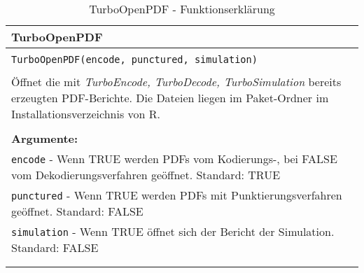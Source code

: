 \begin{longtable}{|p{\textwidth}|}
\hline
\rowcolor{lightblue}TurboOpenPDF\\
\hline
\\
\texttt{TurboOpenPDF(encode, punctured, simulation)}\\
\\
Öffnet die mit \emph{TurboEncode, TurboDecode, TurboSimulation} bereits erzeugten PDF-Berichte. Die Dateien liegen im Paket-Ordner im Installationsverzeichnis von R.\\
\\
\textbf{Argumente:}\\
\texttt{encode} - Wenn TRUE werden PDFs vom Kodierungs-, bei FALSE vom Dekodierungsverfahren geöffnet. Standard: TRUE\\
\texttt{punctured} - Wenn TRUE werden PDFs mit Punktierungsverfahren geöffnet. Standard: FALSE\\
\texttt{simulation} - Wenn TRUE öffnet sich der Bericht der Simulation. Standard: FALSE\\
\\
\hline
\caption[TurboOpenPDF]{TurboOpenPDF - Funktionserklärung}
\end{longtable}